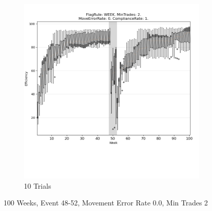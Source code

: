 \documentclass{article}%
\begin{document}
\begin{figure}[!htb]
\begin{subfigure}[b]{0.45\linewidth}
\includegraphics[clip,width=\linewidth,trim=0 4cm 0 0]{0029fr_WEEK_mt_2_er_0_cr_1_t10.png}%
\caption{10 Trials}%
\end{subfigure}%
\caption{100 Weeks, Event 48{-}52, Movement Error Rate 0.0, Min Trades 2}%
\end{figure}

%
\end{document}
